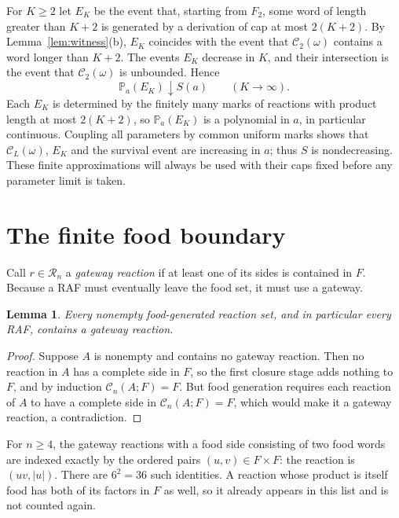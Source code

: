 \documentclass[11pt,reqno]{amsart}
\theoremstyle{plain}
\newtheorem{lemma}[theorem]{Lemma}
\theoremstyle{definition}
\theoremstyle{remark}
\numberwithin{equation}{section}
\newcommand{\Prob}{\mathbb{P}}
\newcommand{\cC}{\mathcal{C}}
\newcommand{\cR}{\mathcal{R}}
\begin{document}
For $K\ge2$ let $E_K$ be the event that, starting from $F_2$, some word of length greater than $K+2$ is generated by a derivation of cap at most $2(K+2)$. By Lemma~\ref{lem:witness}(b), $E_K$ coincides with the event that $\cC_2(\omega)$ contains a word longer than $K+2$. The events $E_K$ decrease in $K$, and their intersection is the event that $\cC_2(\omega)$ is unbounded. Hence
\begin{equation}\label{eq:escape-limit}
\Prob_a(E_K)\downarrow S(a)\qquad(K\to\infty).
\end{equation}
Each $E_K$ is determined by the finitely many marks of reactions with product length at most $2(K+2)$, so $\Prob_a(E_K)$ is a polynomial in $a$, in particular continuous. Coupling all parameters by common uniform marks shows that $\cC_L(\omega)$, $E_K$ and the survival event are increasing in $a$; thus $S$ is nondecreasing. These finite approximations will always be used with their caps fixed before any parameter limit is taken.

\section{The finite food boundary}\label{sec:gateway}

Call $r\in\cR_n$ a \emph{gateway reaction} if at least one of its sides is contained in $F$. Because a RAF must eventually leave the food set, it must use a gateway.

\begin{lemma}\label{lem:gateway-needed}
Every nonempty food-generated reaction set, and in particular every RAF, contains a gateway reaction.
\end{lemma}

\begin{proof}
Suppose $A$ is nonempty and contains no gateway reaction. Then no reaction in $A$ has a complete side in $F$, so the first closure stage adds nothing to $F$, and by induction $\cC_n(A;F)=F$. But food generation requires each reaction of $A$ to have a complete side in $\cC_n(A;F)=F$, which would make it a gateway reaction, a contradiction.
\end{proof}

For $n\ge4$, the gateway reactions with a food side consisting of two food words are indexed exactly by the ordered pairs $(u,v)\in F\times F$: the reaction is $(uv,|u|)$. There are $6^2=36$ such identities. A reaction whose product is itself food has both of its factors in $F$ as well, so it already appears in this list and is not counted again.
\end{document}
